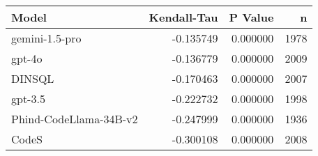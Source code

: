 \begin{tabular}{lrrr}
\toprule
Model & Kendall-Tau & P Value & n \\
\midrule
gemini-1.5-pro & -0.135749 & 0.000000 & 1978 \\
gpt-4o & -0.136779 & 0.000000 & 2009 \\
DINSQL & -0.170463 & 0.000000 & 2007 \\
gpt-3.5 & -0.222732 & 0.000000 & 1998 \\
Phind-CodeLlama-34B-v2 & -0.247999 & 0.000000 & 1936 \\
CodeS & -0.300108 & 0.000000 & 2008 \\
\bottomrule
\end{tabular}
